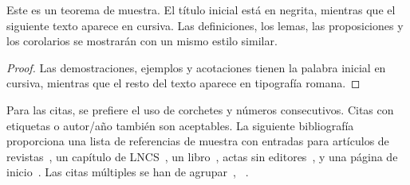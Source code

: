 \documentclass{sistedes}
\begin{document}
\begin{theorem}
Este es un teorema de muestra. El título inicial está en negrita, mientras
que el siguiente texto aparece en cursiva. Las definiciones, los lemas,
las proposiciones y los corolarios se mostrarán con un  mismo estilo similar.
\end{theorem}
%
%
\begin{proof}
Las demostraciones, ejemplos y acotaciones tienen la palabra inicial en cursiva,
mientras que el resto del texto aparece en tipografía romana.
\end{proof}
Para las citas, se prefiere el uso de corchetes
y números consecutivos. Citas con etiquetas o autor/año también
son aceptables. La siguiente bibliografía proporciona una lista de referencias
de muestra con entradas para artículos de revistas~\cite{ref_article1},
un capítulo de LNCS~\cite{ref_lncs1}, un libro~\cite{ref_book1},
actas sin editores~\cite{ref_proc1}, y una página de inicio~\cite{ref_url1}.
Las citas múltiples se han de agrupar~\cite{ref_article1,ref_lncs1,ref_book1},%
~\cite{ref_article1,ref_book1,ref_proc1,ref_url1}.
\end{document}
